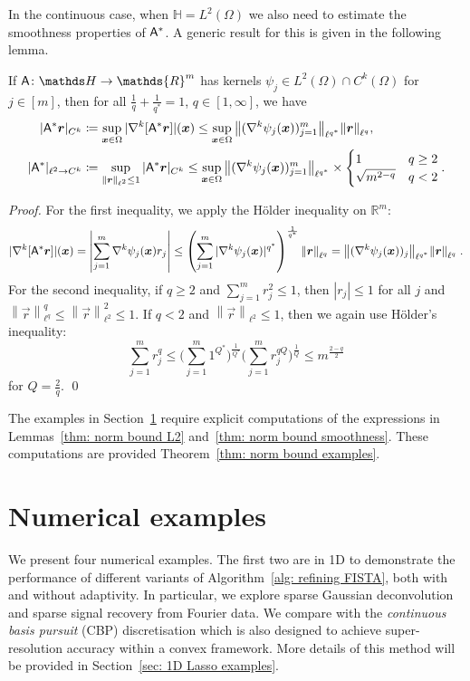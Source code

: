 \documentclass[smallextended]{svjour3}
\let\F\mathds\let\C\mathcal\newcommand{\R}{\F{R}}\newcommand{\A}{\tens{A}}
\newcommand{\norm}[1]{{\left\lVert #1 \right\rVert}}
\newcommand{\splitln}[4]{\begin{cases} #1 & #2 \\ #3 & #4\end{cases}}
\newcommand{\1}{\F{1}}
\newcommand{\Domain}{\Omega}\newcommand{\domain}{\omega}
\newcommand{\edit}[3][1]{%
	\IfEq{#1}{2}{\def\mysecondvar{}}{\def\mysecondvar{#2}}%
	\ifx\mysecondvar\empty{}\else{%
		\IfEq{#1}{1}{%
			\ifmmode%
			\text{\color{red}\sout{\ensuremath{#2}}}%
			\else%
			{\color{red} \sout{#2}}%
			\fi%
		}{\color{red}#2}\ %
	}\fi{\color{darkgreen}#3}}
\begin{document}
	
	In the continuous case, when $\F H=L^2(\Domain)$ we also need to estimate the smoothness properties of $\A^*$. A generic result for this is given in the following lemma.
	\begin{lemma}\label{thm: norm bound smoothness}
		If $\A\colon \F H \to \R^m$ has kernels $\psi_j\in L^2(\Domain)\cap C^k(\Domain)$ for $j\in[m]$, then for all $\frac1q+\frac1{q^*}=1$, $q\in[1,\infty]$, we have
		\begin{align}
			|\A^*\vec{r}|_{C^k}&\coloneqq \sup_{\vec{x}\in\Domain} |\nabla^k[\A^*\vec{r}]|(\vec{x}) \leq \sup_{\vec{x}\in\Domain}\norm{(\nabla^k\psi_j(\vec{x}))_{j=1}^m}_{\ell^{q^*}}\norm{\vec{r}}_{\ell^q},
			\\ |\A^*|_{\ell^2\to C^k}&\coloneqq \sup_{\norm{\vec{r}}_{\ell^2}\leq 1} |\A^*\vec{r}|_{C^k} \leq \sup_{\vec{x}\in\Domain}\norm{(\nabla^k\psi_j(\vec{x}))_{j=1}^m}_{\ell^{q^*}}\times \splitln{1}{q\geq 2}{\sqrt{m^{2-q}}}{q<2}.
		\end{align}
	\end{lemma}
	\begin{proof}
		For the first inequality, we apply the H\"older inequality on $\R^m$:
		$$ |\nabla^k[\A^*\vec{r}]|(\vec{x}) = \left|\sum_{j=1}^m\nabla^k\psi_j(\vec{x})r_j\right|
		\leq \left(\sum_{j=1}^m|\nabla^k\psi_j(\vec{x})|^{q^*}\right)^{\frac{1}{q^*}}\norm{\vec{r}}_{\ell^q} = \norm{(\nabla^k\psi_j(\vec{x}))_j}_{\ell^{q^*}}\norm{\vec{r}}_{\ell^q}\;.$$
		For the second inequality, if $q\geq2$ and $\sum_{j=1}^m r_j^2\leq 1$, then $|r_j|\leq 1$ for all $j$ and $\norm{\vec{r}}_{\ell^q}^q\leq \norm{\vec{r}}_{\ell^2}^2\leq 1$. If $q<2$ and $\norm{\vec{r}}_{\ell^2}\leq 1$, then we again use H\"older's inequality:
		$$\sum_{j=1}^m r_j^q \leq \Big(\sum_{j=1}^m 1^{Q^*}\Big)^{\frac1{Q^*}} \Big(\sum_{j=1}^m r_j^{qQ}\Big)^{\frac1{Q}} \leq m^{\frac{2-q}{2}}$$
		for $Q = \frac2q$.
	\qed\end{proof}
	
	The examples in Section~\ref{sec: numerics} require explicit computations of the expressions in Lemmas~\ref{thm: norm bound L2} and~\ref{thm: norm bound smoothness}. These computations are provided\edit{}{\ in the appendix,} Theorem~\ref{thm: norm bound examples}.
	
	\section{Numerical examples}\label{sec: numerics}
	We present four numerical examples. The first two are in 1D to demonstrate the performance of different variants of Algorithm~\ref{alg: refining FISTA}, both with and without adaptivity. In particular, we explore sparse Gaussian deconvolution and sparse signal recovery from Fourier data. We compare with the \emph{continuous basis pursuit} (CBP) discretisation \cite{Ekanadham2011,Duval2017b} which is also designed to achieve super-resolution accuracy within a convex framework. More details of this method will be provided in Section~\ref{sec: 1D Lasso examples}.
	
\end{document}
